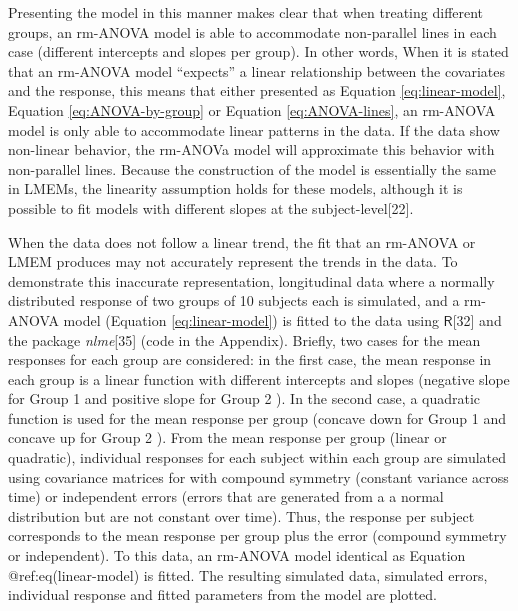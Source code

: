\documentclass[
]{article}
\begin{document}
Presenting the model in this manner makes clear that when treating different groups, an rm-ANOVA model is able to accommodate non-parallel lines in each case (different intercepts and slopes per group). In other words, When it is stated that an rm-ANOVA model ``expects'' a linear relationship between the covariates and the response, this means that either presented as Equation \eqref{eq:linear-model}, Equation \eqref{eq:ANOVA-by-group} or Equation \eqref{eq:ANOVA-lines}, an rm-ANOVA model is only able to accommodate linear patterns in the data. If the data show non-linear behavior, the rm-ANOVa model will approximate this behavior with non-parallel lines. Because the construction of the model is essentially the same in LMEMs, the linearity assumption holds for these models, although it is possible to fit models with different slopes at the subject-level{[}22{]}.

When the data does not follow a linear trend, the fit that an rm-ANOVA or LMEM produces may not accurately represent the trends in the data. To demonstrate this inaccurate representation, longitudinal data where a normally distributed response of two groups of 10 subjects each is simulated, and a rm-ANOVA model (Equation \eqref{eq:linear-model}) is fitted to the data using \(\textsf{R}\){[}32{]} and the package \emph{nlme}{[}35{]} (code in the Appendix). Briefly, two cases for the mean responses for each group are considered: in the first case, the mean response in each group is a linear function with different intercepts and slopes (negative slope for Group 1 and positive slope for Group 2 ). In the second case, a quadratic function is used for the mean response per group (concave down for Group 1 and concave up for Group 2 ). From the mean response per group (linear or quadratic), individual responses for each subject within each group are simulated using covariance matrices for with compound symmetry (constant variance across time) or independent errors (errors that are generated from a a normal distribution but are not constant over time). Thus, the response per subject corresponds to the mean response per group plus the error (compound symmetry or independent). To this data, an rm-ANOVA model identical as Equation @ref:eq(linear-model) is fitted. The resulting simulated data, simulated errors, individual response and fitted parameters from the model are plotted.
\end{document}

